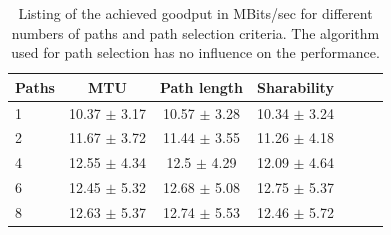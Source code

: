 \begin{table}
	\begin{center}
		\begin{tabular}{lcccccc}\toprule
			Paths & MTU & Path length & Sharability \\\midrule
			1  & 10.37 {\small $\pm$ 3.17} & 10.57 {\small $\pm$ 3.28} & 10.34 {\small $\pm$ 3.24} \\
			2  & 11.67 {\small $\pm$ 3.72} & 11.44 {\small $\pm$ 3.55} & 11.26 {\small $\pm$ 4.18} \\
			4  & 12.55 {\small $\pm$ 4.34} & 12.5  {\small $\pm$ 4.29} & 12.09 {\small $\pm$ 4.64} \\
			6  & 12.45 {\small $\pm$ 5.32} & 12.68 {\small $\pm$ 5.08} & 12.75 {\small $\pm$ 5.37} \\
			8  & 12.63 {\small $\pm$ 5.37} & 12.74 {\small $\pm$ 5.53} & 12.46 {\small $\pm$ 5.72} \\\bottomrule
		\end{tabular}
		\caption{Listing of the achieved goodput in MBits/sec for different numbers of paths and path selection criteria. The algorithm used for path selection has no influence on the performance.}
		\label{tab:InfluenceOfPathSelection}
	\end{center}
\end{table}

